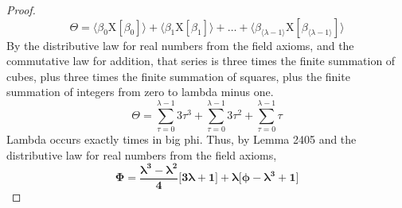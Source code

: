 \documentclass[preview]{standalone}
\begin{document}
\begin{proof}
\begin{equation*}
        \Theta
            =
        \Big \langle \beta_0 \mathrm{X} [\beta_0] \Big \rangle
            +
        \Big \langle \beta_1 \mathrm{X} [\beta_1] \Big \rangle
            + 
        \dots 
            +
        \Big \langle 
            \beta_{\langle \lambda - 1 \rangle}
            \mathrm{X} [\beta_{\langle \lambda - 1 \rangle}]
        \Big \rangle
    \end{equation*}
    By the distributive law for real numbers from the field axioms,
    and the commutative law for addition, that series is
    three times the finite summation of cubes,
    plus three times the finite summation of squares,
    plus the finite summation of integers from zero to lambda minus one.
    \begin{equation*}
        \Theta 
            = 
        \sum_{\tau=0}^{\lambda - 1} 3 \tau ^3
            +
        \sum_{\tau=0}^{\lambda - 1} 3 \tau ^2
            +
        \sum_{\tau=0}^{\lambda - 1} \tau
    \end{equation*}
    Lambda occurs exactly  
    times in big phi. 
    Thus, by Lemma 2405
    and the distributive law for real numbers from the field axioms,
    \begin{equation*}
        \bm{
            \Phi
                =
            \frac{
                \lambda ^3 - \lambda ^2
            }
            {4}
            \Bigg[ 3 \lambda + 1 \Bigg]
                + 
            \lambda
            \Bigg[
                \phi - \lambda ^3 + 1
            \Bigg]
        }
    \end{equation*}
\color{lightgray} \end{proof}
\end{document}

